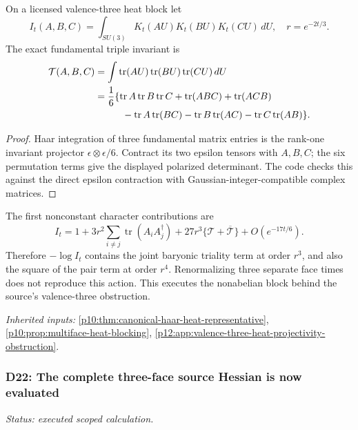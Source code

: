 \documentclass[12pt,a4paper]{article}
\begin{document}
On a licensed valence-three heat block let
\[
 I_t(A,B,C)=\int_{SU(3)}K_t(AU)K_t(BU)K_t(CU)\,dU,
 \quad r=e^{-2t/3}.
\]
The exact fundamental triple invariant is
\begin{align*}
 \mathcal T(A,B,C)&=\int\operatorname{tr}(AU)\operatorname{tr}(BU)
                              \operatorname{tr}(CU)\,dU\\
 &=\frac16\{\operatorname{tr}A\operatorname{tr}B\operatorname{tr}C
  +\operatorname{tr}(ABC)+\operatorname{tr}(ACB)\\
 &\hspace{10mm}-\operatorname{tr}A\operatorname{tr}(BC)
  -\operatorname{tr}B\operatorname{tr}(AC)
  -\operatorname{tr}C\operatorname{tr}(AB)\}.
\end{align*}
\begin{proof}
Haar integration of three fundamental matrix entries is the
rank-one invariant projector $\epsilon\otimes\epsilon/6$. Contract its
two epsilon tensors with $A,B,C$; the six permutation terms give the
displayed polarized determinant. The code checks this against the direct
epsilon contraction with Gaussian-integer-compatible complex matrices.
\end{proof}
The first nonconstant character contributions are
\[
 I_t=1+3r^2\sum_{i\ne j}\operatorname{tr}(A_iA_j^\dagger)
       +27r^3\{\mathcal T+\overline{\mathcal T}\}
       +O(e^{-17t/6}).
\]
Therefore $-\log I_t$ contains the joint baryonic triality term at order
$r^3$, and also the square of the pair term at order $r^4$. Renormalizing
three separate face times does not reproduce this action. This executes
the nonabelian block behind the source's valence-three obstruction.
\par\noindent\textit{Inherited inputs:} \ref{p10:thm:canonical-haar-heat-representative}, \ref{p10:prop:multiface-heat-blocking}, \ref{p12:app:valence-three-heat-projectivity-obstruction}.


\subsubsection{D22: The complete three-face source Hessian is now evaluated}
\label{p10:sec:v2201-derived-d22}
\noindent\textit{Status: executed scoped calculation.}
\end{document}
